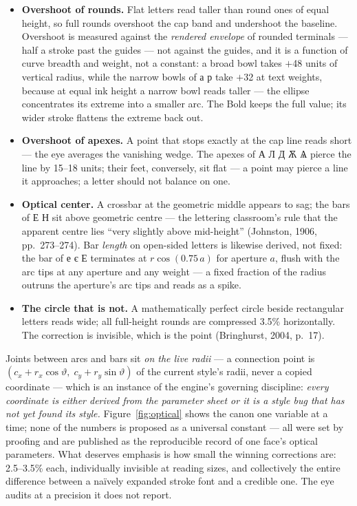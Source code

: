 \documentclass[12pt]{article}
\newcommand{\cz}[1]{{\chu #1}}
\begin{document}
\begin{itemize}
\item \textbf{Overshoot of rounds.} Flat letters read taller than round ones of equal height, so full rounds overshoot the cap band and undershoot the baseline. Overshoot is measured against the \emph{rendered envelope} of rounded terminals — half a stroke past the guides — not against the guides, and it is a function of curve breadth and weight, not a constant: a broad bowl takes $+$48 units of vertical radius, while the narrow bowls of \cz{а р} take $+$32 at text weights, because at equal ink height a narrow bowl reads taller — the ellipse concentrates its extreme into a smaller arc. The Bold keeps the full value; its wider stroke flattens the extreme back out.
\item \textbf{Overshoot of apexes.} A point that stops exactly at the cap line reads short — the eye averages the vanishing wedge. The apexes of \cz{А Л Д Ѫ Ѧ} pierce the line by 15--18 units; their feet, conversely, sit flat — a point may pierce a line it approaches; a letter should not balance on one.
\item \textbf{Optical center.} A crossbar at the geometric middle appears to sag; the bars of \cz{Е Н} sit above geometric centre — the lettering classroom's rule that the apparent centre lies ``very slightly above mid-height'' (Johnston, 1906, pp.\ 273--274). Bar \emph{length} on open-sided letters is likewise derived, not fixed: the bar of \cz{е є Е} terminates at $r\cos(0.75\,a)$ for aperture $a$, flush with the arc tips at any aperture and any weight — a fixed fraction of the radius outruns the aperture's arc tips and reads as a spike.
\item \textbf{The circle that is not.} A mathematically perfect circle beside rectangular letters reads wide; all full-height rounds are compressed 3.5\% horizontally. The correction is invisible, which is the point (Bringhurst, 2004, p.\ 17).
\end{itemize}

Joints between arcs and bars sit \emph{on the live radii} — a connection point is $(c_x + r_x\cos\vartheta,\; c_y + r_y\sin\vartheta)$ of the current style's radii, never a copied coordinate — which is an instance of the engine's governing discipline: \emph{every coordinate is either derived from the parameter sheet or it is a style bug that has not yet found its style.} Figure~\ref{fig:optical} shows the canon one variable at a time; none of the numbers is proposed as a universal constant — all were set by proofing and are published as the reproducible record of one face's optical parameters. What deserves emphasis is how small the winning corrections are: 2.5--3.5\% each, individually invisible at reading sizes, and collectively the entire difference between a naïvely expanded stroke font and a credible one. The eye audits at a precision it does not report.
\end{document}
